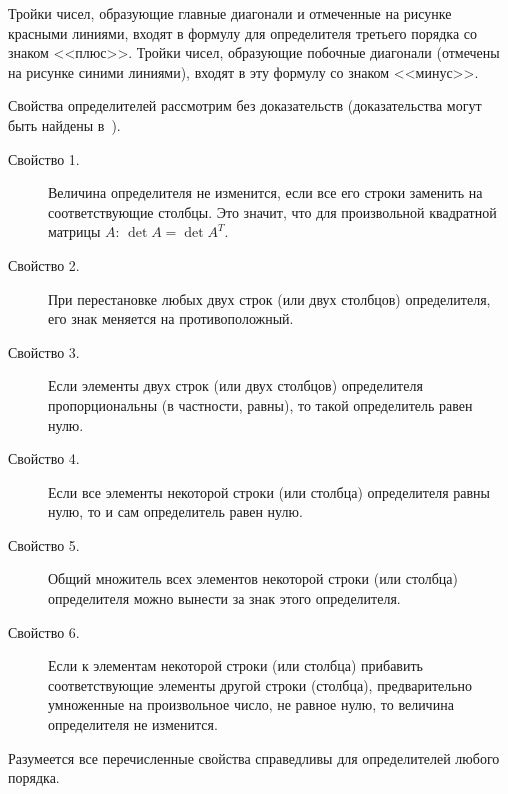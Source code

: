 \documentclass[10pt]{article}
\numberwithin{primer}{section}
\numberwithin{equation}{section}
\begin{document}
\begin{minipage}[c]{0.7\textwidth}
\end{minipage}
Тройки чисел, образующие главные диагонали  и отмеченные на рисунке
красными линиями, входят в формулу для определителя третьего
порядка со знаком <<плюс>>. Тройки чисел, образующие побочные
диагонали (отмечены на рисунке синими линиями), входят  в эту
формулу со знаком <<минус>>.

Свойства определителей рассмотрим без доказательств
(доказательства могут быть найдены в~\cite{Ilin:2002}).
\begin{description}
    \item[Свойство 1.] Величина определителя не изменится, если
    все его строки заменить на соответствующие столбцы. Это
    значит, что для произвольной квадратной матрицы $A$: $\det A = \det
    A^T$.
    \item[Свойство 2.] При перестановке любых двух строк (или двух
    столбцов) определителя, его знак меняется на противоположный.
    \item[Свойство 3.] Если элементы двух строк (или двух
    столбцов) определителя пропорциональны (в частности, равны),
    то такой определитель равен нулю.
    \item[Свойство 4.] Если все элементы некоторой строки (или
    столбца) определителя равны нулю, то и сам определитель равен
    нулю.
    \item[Свойство 5.] Общий множитель всех элементов некоторой
    строки (или столбца) определителя можно вынести за знак этого
    определителя.
    \item[Свойство 6.] Если к элементам некоторой строки (или
    столбца) прибавить соответствующие элементы
    другой строки (столбца), предварительно умноженные на
    произвольное число, не равное нулю, то величина определителя
    не изменится.
\end{description}
Разумеется все перечисленные свойства справедливы для
определителей любого порядка.
\end{document}
